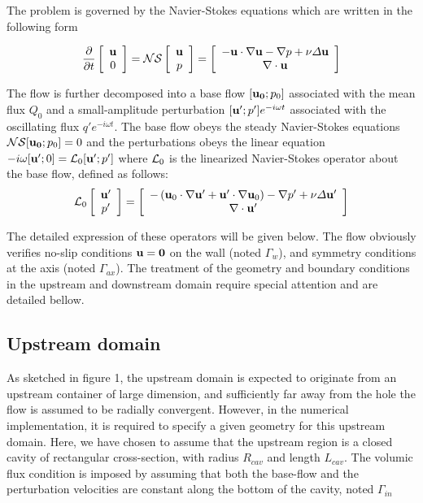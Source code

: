 \documentclass{jfm}
\newcommand\be{\begin{equation}}
\newcommand\ee{\end{equation}}
\newcommand\DP[2]{\frac{\p #1}{\p #2}}
\begin{document}
The problem is governed by the Navier-Stokes equations which are written in the following form
  
\be
\DP{ }{t} \left[\begin{array}{c} {\bf u} \\ 0 \end{array} \right] = 
{\cal NS} \left[\begin{array}{c} {\bf u} \\ p \end{array} \right] =
 \left[\begin{array}{c}
- {\bf u} \cdot \nabla {\bf u} - \nabla p + \nu \Delta {\bf u} \\
 \nabla \cdot {\bf u} 
\end{array} \right] 
\label{eq:NS}
\ee 

The flow is further decomposed into a base flow $[{\bf u_0};p_0]$ associated with the mean flux $Q_0$ and a small-amplitude perturbation  $[{\bf u}';p']e^{-i \omega t}$ associated with the oscillating flux $q' e^{-i \omega t}$.
The base flow obeys the steady Navier-Stokes equations ${\cal NS} [{\bf u_0};p_0] = 0$
and the perturbations obeys the linear equation $- i \omega [{\bf u}';0] = {\cal L}_0 [{\bf u}';p']$ where ${\cal L}_0$
is the linearized Navier-Stokes operator about the base flow, defined as follows: 
\be
{\cal L}_0 \left[\begin{array}{c} {\bf u}' \\ p' \end{array} \right] =
 \left[\begin{array}{c}
- \left( {\bf u}_0 \cdot \nabla {\bf u}' +{\bf u}' \cdot \nabla {\bf u}_0 \right) - \nabla p' + \nu \Delta {\bf u}' \\
 \nabla \cdot {\bf u}' 
\end{array} \right] 
\label{eq:NS}
\ee 

 The detailed expression of these operators will be given below. The flow obviously verifies no-slip conditions ${\bf u} = {\bf 0}$ on the wall (noted $\Gamma_w$),  and symmetry conditions at the axis (noted $\Gamma_{ax}$). The treatment of the geometry and boundary conditions in the upstream and downstream domain require special attention and are detailed bellow.

\subsection{Upstream domain}

As sketched in figure 1, the upstream domain is expected to originate from an upstream container of large dimension, and sufficiently far away from the hole the flow is assumed to be radially convergent. However, in the numerical implementation, it is required to specify a given geometry for this upstream domain. Here, we have chosen to assume that the upstream region is a closed cavity of rectangular cross-section, with radius $R_{cav}$ and length $L_{cav}$. The volumic flux condition is imposed by assuming that both the base-flow and the perturbation velocities are constant along the bottom of the cavity, noted $\Gamma_{in}$
\end{document}
